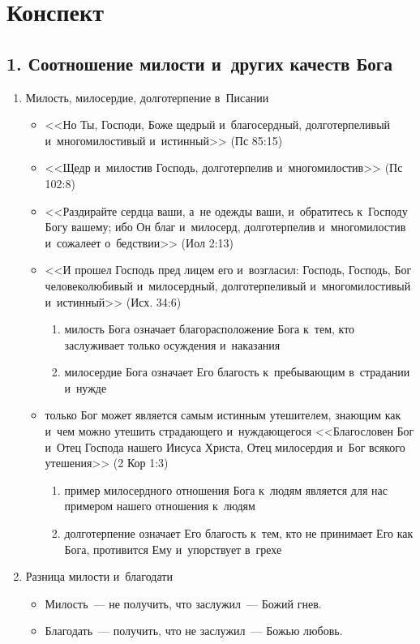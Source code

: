 \documentclass[a4paper,12pt]{article}
\begin{document}
\section*{Конспект}

\subsection{1. Соотношение милости и~других качеств Бога}

\begin{enumerate}

    \item Милость, милосердие, долготерпение в~Писании 
    \begin{itemize}
        \item <<Но Ты, Господи, Боже щедрый и~благосердный, долготерпеливый и~многомилостивый и~истинный>> (Пс 85:15) 
        \item <<Щедр и~милостив Господь, долготерпелив и~многомилостив>> (Пс 102:8)
        \item <<Раздирайте сердца ваши, а~не одежды ваши, и~обратитесь к~Господу Богу вашему; ибо Он благ и~милосерд, долготерпелив и~многомилостив и~сожалеет о~бедствии>> (Иол 2:13)
        \item <<И прошел Господь пред лицем его и~возгласил: Господь, Господь, Бог человеколюбивый и~милосердный, долготерпеливый и~многомилостивый и~истинный>> (Исх. 34:6)
        \begin{enumerate}
            \item милость Бога означает благорасположение Бога к~тем, кто заслуживает только осуждения и~наказания
            \item милосердие Бога означает Его благость к~пребывающим в~страдании и~нужде
        \end{enumerate}
        \item только Бог может является самым истинным утешителем, знающим как и~чем можно утешить страдающего и~нуждающегося <<Благословен Бог и~Отец Господа нашего Иисуса Христа, Отец милосердия и~Бог всякого утешения>> (2 Кор 1:3)
        \begin{enumerate}
            \item пример милосердного отношения Бога к~людям является для нас примером нашего отношения к~людям
            \item долготерпение означает Его благость к~тем, кто не принимает Его как Бога, противится Ему и~упорствует в~грехе
        \end{enumerate}

         
    \end{itemize}

    \item Разница милости и~благодати
    \begin{itemize}
        \item Милость~--- не получить, что заслужил~--- Божий гнев.
        \item Благодать~--- получить, что не заслужил~--- Божью любовь.
    \end{itemize}
\end{enumerate}
\end{document}
